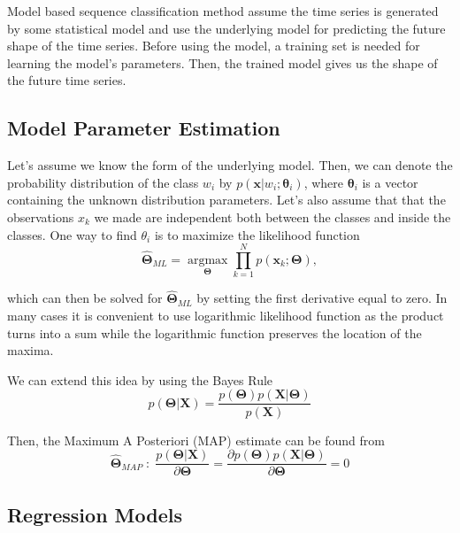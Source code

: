 Model based sequence classification method assume the time series is generated by some statistical model and use the underlying model for predicting the future shape of the time series. Before using the model, a training set is needed for learning the model's parameters. Then, the trained model gives us the shape of the future time series.

\subsection{Model Parameter Estimation}
Let's assume we know the form of the underlying model. Then, we can denote the probability distribution of the class $w_i$ by $p(\mathbf{x}|w_i; \mathbf{\theta}_i)$, where $\mathbf{\theta}_i$ is a vector containing the unknown distribution parameters. Let's also assume that that the observations $x_k$ we made are independent both between the classes and inside the classes. One way to find $\theta_i$ is to maximize the likelihood function
\begin{equation}
\mathbf{\hat{\Theta}}_{ML} = \underset{\mathbf{\Theta}}{\operatorname{argmax}}{\prod_{k=1}^N p(\mathbf{x}_k; \mathbf{\Theta})},
\end{equation} 

which can then be solved for $\mathbf{\hat{\Theta}}_{ML}$ by setting the first derivative equal to zero. In many cases it is convenient to use logarithmic likelihood function as the product turns into a sum while the logarithmic function preserves the location of the maxima.

We can extend this idea by using the Bayes Rule
\begin{equation}
p(\mathbf{\Theta}|\mathbf{X}) = \frac{p(\mathbf{\Theta}) p(\mathbf{X}|\mathbf{\Theta})}{p(\mathbf{X})}
\end{equation}

Then, the Maximum A Posteriori (MAP) estimate can be found from
\begin{equation}
\mathbf{\hat{\Theta}}_{MAP} \; : \; \frac{p(\mathbf{\Theta}|\mathbf{X})}{\partial \mathbf{\Theta}} = \frac{\partial p(\mathbf{\Theta}) p(\mathbf{X}|\mathbf{\Theta})}{\partial \mathbf{\Theta}} = 0
\end{equation}




\subsection{Regression Models}





